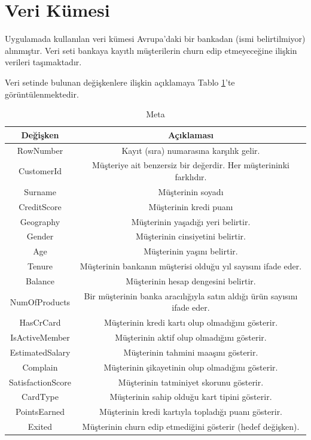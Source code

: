 \documentclass{article}
\begin{document}
\clearpage
\section{Veri Kümesi}
Uygulamada kullanılan veri kümesi Avrupa'daki bir bankadan (ismi belirtilmiyor) alınmıştır. Veri seti bankaya kayıtlı müşterilerin churn edip etmeyeceğine ilişkin verileri taşımaktadır.

Veri setinde bulunan değişkenlere ilişkin açıklamaya Tablo \ref{metadata}'te görüntülenmektedir.

\begin{table}[h]
    \caption{Meta}
    \label{metadata}
    \begin{tabular}{|c|c|}
        \hline
        \textbf{Değişken} & \textbf{Açıklaması} \\
        \hline
        RowNumber & Kayıt (sıra) numarasına karşılık gelir.\\
        \hline
        CustomerId & Müşteriye ait benzersiz bir değerdir. Her müşterininki farklıdır. \\
        \hline
        Surname & Müşterinin soyadı \\
        \hline
        CreditScore & Müşterinin kredi puanı \\
        \hline
        Geography & Müşterinin yaşadığı yeri belirtir. \\
        \hline
        Gender & Müşterinin cinsiyetini belirtir. \\
        \hline
        Age & Müşterinin yaşını belirtir. \\
        \hline
        Tenure & Müşterinin bankanın müşterisi olduğu yıl sayısını ifade eder. \\
        \hline
        Balance & Müşterinin hesap dengesini belirtir. \\
        \hline
        NumOfProducts & Bir müşterinin banka aracılığıyla satın aldığı ürün sayısını ifade eder. \\
        \hline
        HasCrCard & Müşterinin kredi kartı olup olmadığını gösterir. \\
        \hline
        IsActiveMember & Müşterinin aktif olup olmadığını gösterir. \\
        \hline
        EstimatedSalary & Müşterinin tahmini maaşını gösterir. \\
        \hline
        Complain & Müşterinin şikayetinin olup olmadığını gösterir. \\
        \hline
        SatisfactionScore & Müşterinin tatminiyet skorunu gösterir. \\
        \hline
        CardType & Müşterinin sahip olduğu kart tipini gösterir. \\
        \hline
        PointsEarned & Müşterinin kredi kartıyla topladığı puanı gösterir. \\
        \hline
        Exited & Müşterinin churn edip etmediğini gösterir (hedef değişken). \\
        \hline
    \end{tabular}
\end{table}
\end{document}
